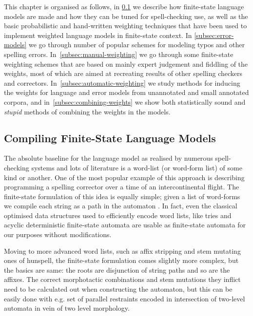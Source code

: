\documentclass[a4paper,12pt]{article}
\begin{document}
This chapter is organised as follows, in \ref{subsec:language-models} we
describe how finite-state language models are made and how they can be tuned
for spell-checking use, as well as the basic probabilistic and hand-written
weighting techniques that have been used to implement weighted language models
in finite-state context. In \ref{subsec:error-models} we go through number of
popular schemes for modeling typos and other spelling errors. 
In~\ref{subsec:manual-weighting} we go through some finite-state weighting
schemes that are based on mainly expert judgement and fiddling of the weights,
most of which are aimed at recreating results of other spelling checkers and
correctors. In~\ref{subsec:automatic-weighting} we study methods for
inducing the weights for language and error models from unannotated and
small annotated corpora, and in~\ref{subsec:combining-weights} we show both
statistically sound and \emph{stupid} methods of combining the weights in the
models.

\subsection{Compiling Finite-State Language Models}
\label{subsec:language-models}

The absolute baseline for the language model as realised by numerous
spell-checking systems and lots of literature is a word-list (or word-form
list) of some kind or another. One of the most popular example of this approach
is \cite{norvig/2010} describing programming a spelling corrector over a time
of an intercontinental flight. The finite-state formulation of this idea is
equally simple; given a list of word-forms we compile each string as a path in
the automaton \cite{pirinen2012effects}. In fact, even the classical
optimised data structures used to efficiently encode word lists, like tries and
acyclic deterministic finite-state automata are usable as finite-state automata
for our purposes without modifications.

Moving to more advanced word lists, such as affix stripping and stem mutating
ones of hunspell, the finite-state formulation comes slightly more complex, but
the basics are same: the roots are disjunction of string paths and so are the
affixes. The correct morphotactic combinations and stem mutations they inflict
need to be calculated out when constructing the automaton, but this can be
easily done with e.g. set of parallel restraints encoded in intersection of
two-level automata\cite{pirinen2010creating} in vein of two level morphology.
\end{document}
